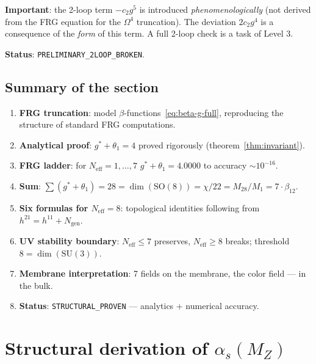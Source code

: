 \documentclass[11pt,a4paper]{article}
\newcommand{\SU}{\ensuremath{\mathrm{SU}}}
\newcommand{\SO}{\ensuremath{\mathrm{SO}}}
\newcommand{\Om}{\ensuremath{\Omega^4}}
\theoremstyle{definition}
\begin{document}
\medskip\noindent
\textbf{Important}: the 2-loop term $-c_2 g^5$ is introduced
\emph{phenomenologically} (not derived from the FRG equation for the
$\Om$ truncation). The deviation
$2c_2 g^4$ is a consequence of the \emph{form} of this term.
A full 2-loop check is a task of Level 3.

\medskip\noindent
\textbf{Status}: \texttt{PRELIMINARY\_2LOOP\_BROKEN}.

\subsection{Summary of the section}
\label{subsec:frg-summary}

\begin{enumerate}
    \item \textbf{FRG truncation}: model $\beta$-functions~\eqref{eq:beta-g-full},
          reproducing the structure of standard FRG computations.
    \item \textbf{Analytical proof}: $g^* + \theta_1 = 4$
          proved rigorously (theorem~\ref{thm:invariant}).
    \item \textbf{FRG ladder}: for $N_{\text{eff}} = 1, \ldots, 7$
          $g^* + \theta_1 = 4.0000$ to accuracy $\sim 10^{-16}$.
    \item \textbf{Sum}: $\sum(g^* + \theta_1) = 28 = \dim(\SO(8)) =
          \chi/22 = M_{28}/M_1 = 7 \cdot \beta_{12}$.
    \item \textbf{Six formulas for $N_{\text{eff}} = 8$}: topological
          identities following from $h^{21} = h^{11} + N_{\text{gen}}$.
    \item \textbf{UV stability boundary}: $N_{\text{eff}} \le 7$
          preserves, $N_{\text{eff}} \ge 8$ breaks; threshold
          $8 = \dim(\SU(3))$.
    \item \textbf{Membrane interpretation}: 7 fields on the membrane,
          the color field --- in the bulk.
    \item \textbf{Status}: \texttt{STRUCTURAL\_PROVEN} ---
          analytics + numerical accuracy.
\end{enumerate}

\section{Structural derivation of \texorpdfstring{$\alpha_s(M_Z)$}{alpha\_s(M\_Z)}}
\label{sec:alphas}
\end{document}
